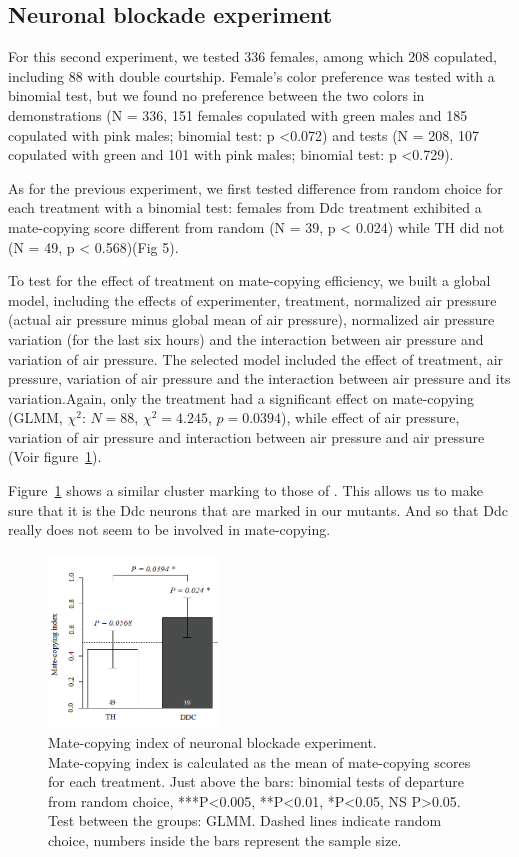\documentclass[a4paper, 12pt]{article}
\begin{document}
\subsection{Neuronal blockade experiment}

For this second experiment, we tested 336 females, among which 208 copulated, including 88 with double courtship. Female's color preference was tested with a binomial test, but we found no preference between the two colors in demonstrations (N = 336, 151 females copulated with green males and 185 copulated with pink males; binomial test: p {\textless}0.072) and tests (N = 208, 107 copulated with green and 101 with pink males; binomial test: p {\textless}0.729).

As for the previous experiment, we first tested difference from random choice for each treatment with a binomial test: females from Ddc treatment exhibited a mate-copying score different from random (N = 39, p {\textless} 0.024) while TH did not (N = 49, p {\textless} 0.568)(Fig 5).

To test for the effect of treatment on mate-copying efficiency, we built a global model, including the effects of experimenter, treatment, normalized air pressure (actual air pressure minus global mean of air pressure), normalized air pressure variation (for the last six hours) and the interaction between air pressure and variation of air pressure. The selected model included the effect of treatment, air pressure, variation of air pressure and the interaction between air pressure and its variation.Again, only the treatment had a significant effect on mate-copying (GLMM, $\chi^2$: $N = 88$, $\chi^2 = 4.245$, $p = 0.0394$), while effect of air pressure, variation of air pressure and interaction between air pressure and air pressure (Voir figure~\ref{fig:mcnb}).

Figure~\ref{fig:mcnb} shows a similar cluster marking to those of \textcite{liu_subset_2012}. This allows us to make sure that it is the Ddc neurons that are marked in our mutants. And so that Ddc really does not seem to be involved in mate-copying.

\begin{figure}
	\centering
	\includegraphics[width=0.4\textwidth]{images/mcnb}
	\caption{Mate-copying index of neuronal blockade experiment. \\
		Mate-copying index is calculated as the mean of mate-copying scores for each treatment. Just above the bars: binomial tests of departure from random choice, ***P<0.005, **P<0.01, *P<0.05, NS P>0.05. Test between the groups: GLMM. Dashed lines indicate random choice, numbers inside the bars represent the sample size.}
	\label{fig:mcnb}
\end{figure}
\end{document}
